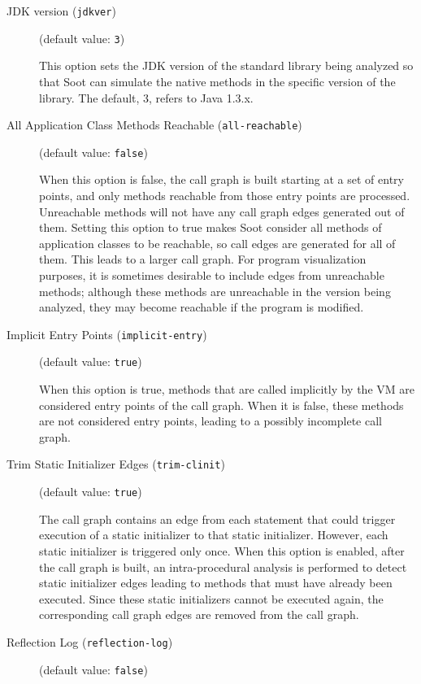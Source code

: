 \documentclass{article}
\begin{document}
\begin{description}
\item[JDK version ({\tt jdkver})]
(default value: {\tt 3})



This option sets the JDK version of the standard library being analyzed so that Soot can simulate the native methods in the specific version of the library. The default, 3, refers to Java 1.3.x.


\item[All Application Class Methods Reachable ({\tt all-reachable})]
(default value: {\tt false})



When this option is false, the call graph is built starting at a set of entry points, and only methods reachable from those entry points are processed. Unreachable methods will not have any call graph edges generated out of them. Setting this option to true makes Soot consider all methods of application classes to be reachable, so call edges are generated for all of them. This leads to a larger call graph. For program visualization purposes, it is sometimes desirable to include edges from unreachable methods; although these methods are unreachable in the version being analyzed, they may become reachable if the program is modified.


\item[Implicit Entry Points ({\tt implicit-entry})]
(default value: {\tt true})



When this option is true, methods that are called implicitly by the VM are considered entry points of the call graph. When it is false, these methods are not considered entry points, leading to a possibly incomplete call graph.


\item[Trim Static Initializer Edges ({\tt trim-clinit})]
(default value: {\tt true})



The call graph contains an edge
from each statement that could trigger execution of a static initializer to that
static initializer. However, each static initializer is triggered only once.
When this option is enabled, after the call graph is built, an intra-procedural
analysis is performed to detect static initializer edges leading to methods
that must have already been executed. Since these static initializers cannot be
executed again, the corresponding call graph edges are removed from the call graph.



\item[Reflection Log ({\tt reflection-log})]
(default value: {\tt false})




\end{description}
\end{document}
